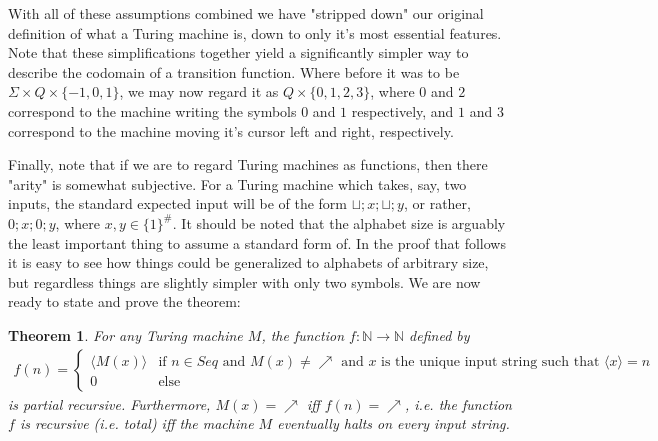 \documentclass{article}
\theoremstyle{definition}
\theoremstyle{plain}
\theoremstyle{theorem}
\newtheorem{theorem}{Theorem}[section]
\begin{document}
\par With all of these assumptions combined we have "stripped down" our original definition of what a Turing machine is, down to only it's most essential features. Note that these simplifications together yield a significantly simpler way to describe the codomain of a transition function. Where before it was to be $\Sigma \times Q \times \{-1,0,1\}$, we may now regard it as $Q \times \{0,1,2,3\}$, where $0$ and $2$ correspond to the machine writing the symbols $0$ and $1$ respectively, and $1$ and $3$ correspond to the machine moving it's cursor left and right, respectively.
\par Finally, note that if we are to regard Turing machines as functions, then there "arity" is somewhat subjective. For a Turing machine which takes, say, two inputs, the standard expected input will be of the form $\sqcup;x;\sqcup;y$, or rather, $0;x;0;y$, where $x,y \in \{1\}^{\#}$. It should be noted that the alphabet size is arguably the least important thing to assume a standard form of. In the proof that follows it is easy to see how things could be generalized to alphabets of arbitrary size, but regardless things are slightly simpler with only two symbols.
 We are now ready to state and prove the theorem:
\begin{theorem}
    For any Turing machine $M$, the function $f:\mathbb{N} \to \mathbb{N}$ defined by
    \begin{align}
        f(n) = \begin{cases}
                  \langle M(x) \rangle & \textrm{if $n \in Seq$ and $M(x) \neq \nearrow$ and $x$ is the unique input string such that $\langle x \rangle = n$} \\
                  0 & \textrm{else}
               \end{cases}
    \end{align}
    is partial recursive. Furthermore, $M(x) = \nearrow$ iff $f(n) = \nearrow$, i.e. the function $f$ is recursive (i.e. total) iff the machine $M$ eventually halts on every input string.
\end{theorem}
\end{document}
